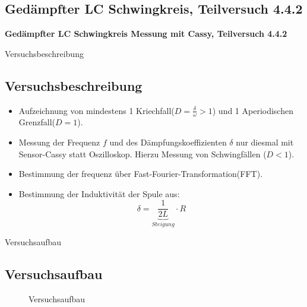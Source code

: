 \documentclass[11pt]{beamer}
\author{Gruppe C14 \\ Julián Häck, Martin Koytek, Lars Wenning, Erik Zimmermann \\ Vortragender: Lars Wenning}
\begin{document}
\begin{frame}
\titlepage
\end{frame}


\begin{frame}
\section{Gedämpfter LC Schwingkreis, Teilversuch 4.4.2}
\textbf{Gedämpfter LC Schwingkreis Messung mit Cassy, Teilversuch 4.4.2}\centering
\end{frame}

\begin{frame}{Versuchsbeschreibung}
\subsection{Versuchsbeschreibung}
\begin{itemize}
\item Aufzeichnung von mindestens 1 Kriechfall($D=\frac{\delta}{\omega}>1$) und 1 Aperiodischen Grenzfall($D=1$).
\item Messung der Frequenz $f$ und des Dämpfungskoeffizienten $\delta$ nur diesmal mit Sensor-Cassy statt Oszilloskop. Hierzu Messung von Schwingfällen ($D<1$).
\item Bestimmung der frequenz über Fast-Fourier-Transformation(FFT).
\item Bestimmung der Induktivität der Spule aus:
\begin{equation}
\delta =\underbrace{\frac{1}{2L}}_{Steigung}\cdot R
\end{equation}
\end{itemize}
\end{frame}

\begin{frame}{Versuchsaufbau}
\subsection{Versuchsaufbau}
\begin{figure}[H]
\caption{Versuchsaufbau}
\end{figure}
\end{frame}
\end{document}
